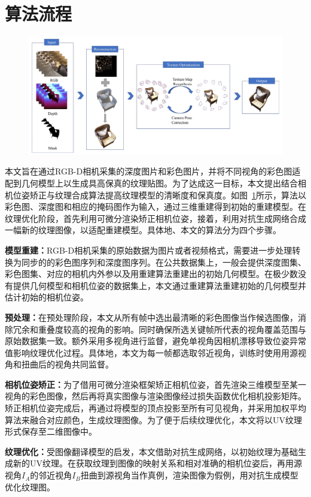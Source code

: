 \section{算法流程}
\begin{figure}[!t]
    \centering
    \includegraphics[width=1\columnwidth]{pic/work1/work1.pdf}
    \label{fig:work1}
\end{figure}

本文旨在通过RGB-D相机采集的深度图片和彩色图片，并将不同视角的彩色图适配到几何模型上以生成具高保真的纹理贴图。为了达成这一目标，本文提出结合相机位姿矫正与纹理合成算法提高纹理模型的清晰度和保真度。如图~\ref{fig:work1}所示，算法以彩色图、深度图和相应的掩码图作为输入，通过三维重建得到初始的重建模型。在纹理优化阶段，首先利用可微分渲染矫正相机位姿，接着，利用对抗生成网络合成一幅新的纹理图像，以适配重建模型。具体地、本文的算法分为四个步骤。\par
\noindent\textbf{模型重建：}RGB-D相机采集的原始数据为图片或者视频格式，需要进一步处理转换为同步的的彩色图序列和深度图序列。在公共数据集上，一般会提供深度图集、彩色图集、对应的相机内外参以及用重建算法重建出的初始几何模型。在极少数没有提供几何模型和相机位姿的数据集上，本文通过重建算法重建初始的几何模型并估计初始的相机位姿。\par
\noindent\textbf{预处理：}在预处理阶段，本文从所有帧中选出最清晰的彩色图像当作候选图像，消除冗余和重叠度较高的视角的影响。同时确保所选关键帧所代表的视角覆盖范围与原始数据集一致。额外采用多视角进行监督，避免单视角因相机漂移导致位姿异常值影响纹理优化过程。具体地，本文为每一帧都选取邻近视角，训练时使用用源视角和扭曲后的视角共同监督。\par
\noindent\textbf{相机位姿矫正：}为了借用可微分渲染框架矫正相机位姿，首先渲染三维模型至某一视角的彩色图像，然后再将真实图像与渲染图像经过损失函数优化相机投影矩阵。矫正相机位姿完成后，再通过将模型的顶点投影至所有可见视角，并采用加权平均算法来融合对应颜色，生成纹理图像。为了便于后续纹理优化，本文将以UV纹理形式保存至二维图像中。\par
\noindent\textbf{纹理优化：}受图像翻译模型的启发，本文借助对抗生成网络，以初始纹理为基础生成新的UV纹理。在获取纹理到图像的映射关系和相对准确的相机位姿后，再用源视角$I_A$的邻近视角$I_B$扭曲到源视角当作真例，渲染图像为假例，用对抗生成模型优化纹理图。\par

